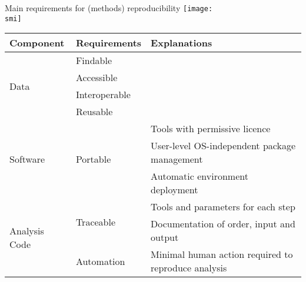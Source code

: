 \documentclass[10pt]{beamer}
\def\smi{out/ln/updir/mw-gcthesis-oral/library.bib}
\begin{document}
    \begin{frame}{Main requirements for (methods) reproducibility}
      \def\smi{out/ln/updir/mw-gcthesis-oral/ink/reproducibility/arrow_reproducibility.pdf}
      \texttt{[image: \\smi]}

      {\scriptsize
      \begin{tabular}{@{}lll@{}}
        \toprule
        Component                      & Requirements                & Explanations            \\ \midrule
        \multirow{4}{*}{Data}          & Findable &                                \\
        & Accessible                        &       \\
        & Interoperable                    &        \\ 
        & Reusable                          &       \\ \midrule
        \multirow{3}{*}{Software}             & \multirow{3}{*}{Portable} & Tools with permissive licence \\
        & & User-level OS-independent package management            \\
        & & Automatic environment deployment           \\ \midrule
        \multirow{3}{*}{Analysis Code} & \multirow{2}{*}{Traceable} & Tools and parameters for each step       \\
        & & Documentation of order, input and output \\
        & Automation & Minimal human action required to reproduce analysis \\ \bottomrule
      \end{tabular}
      }
    \end{frame}
\end{document}

